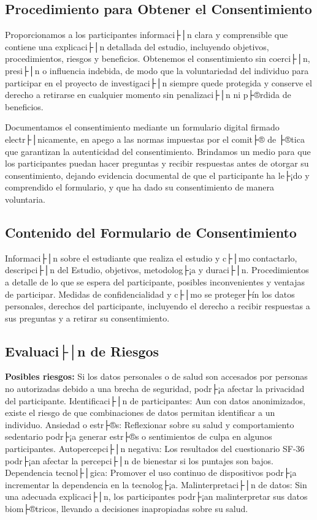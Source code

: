 \subsection{Procedimiento para Obtener el Consentimiento}
\label{subsec:procedimiento_consentimiento}

Proporcionamos a los participantes informaci├│n clara y comprensible que contiene una explicaci├│n detallada del estudio, incluyendo objetivos, procedimientos, riesgos y beneficios. Obtenemos el consentimiento sin coerci├│n, presi├│n o influencia indebida, de modo que la voluntariedad del individuo para participar en el proyecto de investigaci├│n siempre quede protegida y conserve el derecho a retirarse en cualquier momento sin penalizaci├│n ni p├®rdida de beneficios.

Documentamos el consentimiento mediante un formulario digital firmado electr├│nicamente, en apego a las normas impuestas por el comit├® de ├®tica que garantizan la autenticidad del consentimiento. Brindamos un medio para que los participantes puedan hacer preguntas y recibir respuestas antes de otorgar su consentimiento, dejando evidencia documental de que el participante ha le├¡do y comprendido el formulario, y que ha dado su consentimiento de manera voluntaria.

\subsection{Contenido del Formulario de Consentimiento}
\label{subsec:contenido_formulario_consentimiento}

Informaci├│n sobre el estudiante que realiza el estudio y c├│mo contactarlo, descripci├│n del Estudio, objetivos, metodolog├¡a y duraci├│n. Procedimientos a detalle de lo que se espera del participante, posibles inconvenientes y ventajas de participar. Medidas de confidencialidad y c├│mo se proteger├ín los datos personales, derechos del participante, incluyendo el derecho a recibir respuestas a sus preguntas y a retirar su consentimiento.

\subsection{Evaluaci├│n de Riesgos}
\label{subsec:evaluacion_riesgos}

\textbf{Posibles riesgos:} Si los datos personales o de salud son accesados por personas no autorizadas debido a una brecha de seguridad, podr├¡a afectar la privacidad del participante. Identificaci├│n de participantes: Aun con datos anonimizados, existe el riesgo de que combinaciones de datos permitan identificar a un individuo. Ansiedad o estr├®s: Reflexionar sobre su salud y comportamiento sedentario podr├¡a generar estr├®s o sentimientos de culpa en algunos participantes. Autopercepci├│n negativa: Los resultados del cuestionario SF-36 podr├¡an afectar la percepci├│n de bienestar si los puntajes son bajos. Dependencia tecnol├│gica: Promover el uso continuo de dispositivos podr├¡a incrementar la dependencia en la tecnolog├¡a. Malinterpretaci├│n de datos: Sin una adecuada explicaci├│n, los participantes podr├¡an malinterpretar sus datos biom├®tricos, llevando a decisiones inapropiadas sobre su salud.

